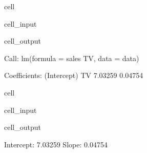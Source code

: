 \documentclass[letterpaper,10pt,english]{jupyterBook}
\begin{document}
\begin{sphinxuseclass}{cell}\begin{sphinxVerbatimInput}

\begin{sphinxuseclass}{cell_input}
\begin{sphinxVerbatim}[commandchars=\\\{\}]
\end{sphinxVerbatim}

\end{sphinxuseclass}\end{sphinxVerbatimInput}
\begin{sphinxVerbatimOutput}

\begin{sphinxuseclass}{cell_output}
\begin{sphinxVerbatim}[commandchars=\\\{\}]
Call:
lm(formula = sales \PYGZti{} TV, data = data)

Coefficients:
(Intercept)           TV  
    7.03259      0.04754  
\end{sphinxVerbatim}

\end{sphinxuseclass}\end{sphinxVerbatimOutput}

\end{sphinxuseclass}
\begin{sphinxuseclass}{cell}\begin{sphinxVerbatimInput}

\begin{sphinxuseclass}{cell_input}
\begin{sphinxVerbatim}[commandchars=\\\{\}]
\end{sphinxVerbatim}

\end{sphinxuseclass}\end{sphinxVerbatimInput}
\begin{sphinxVerbatimOutput}

\begin{sphinxuseclass}{cell_output}
\noindent{}

\end{sphinxuseclass}\end{sphinxVerbatimOutput}

\end{sphinxuseclass}
\sphinxAtStartPar
Intercept: 7.03259
Slope: 0.04754
\end{document}
